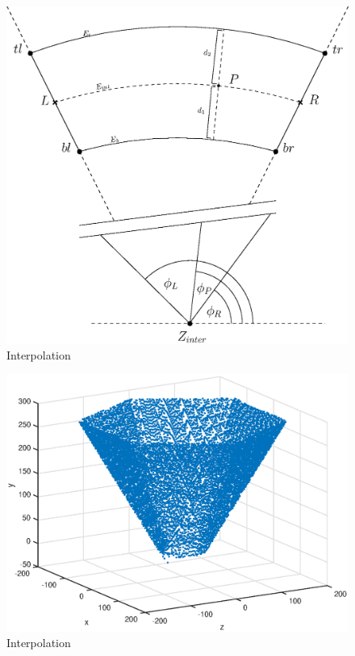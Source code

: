 \begin{figure}[!htb]
	\centering
	\includegraphics[scale=.6]{images/radialInterpolation.eps}
	\caption{Interpolation}
	\label{fig:radialInterpolation}
\end{figure}


\begin{figure}[!htb]
	\centering
	\includegraphics[scale=.7]{images/3d_interpol.eps}
	\caption{Interpolation}
	\label{fig:3DInterpol}
\end{figure}




